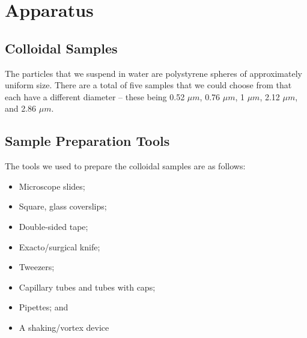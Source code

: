 \documentclass[twocolumn,amsmath,amssymb,pra, floatfix]{revtex4-2}
\begin{document}
\section{Apparatus}
\subsection{Colloidal Samples}
The particles that we suspend in water are polystyrene spheres of approximately uniform size. There are a total of five samples that we could choose from that each have a different diameter -- these being 0.52 $\si{\mu m}$, 0.76 $\si{\mu m}$, 1 $\si{\mu m}$, 2.12 $\si{\mu m}$, and 2.86 $\si{\mu m}$.

\subsection{Sample Preparation Tools}
The tools we used to prepare the colloidal samples are as follows:
\begin{itemize}
    \item Microscope slides;
    \item Square, glass coverslips;
    \item Double-sided tape;
    \item Exacto/surgical knife;
    \item Tweezers;
    \item Capillary tubes and tubes with caps;
    \item Pipettes; and
    \item A shaking/vortex device
\end{itemize}
\end{document}
